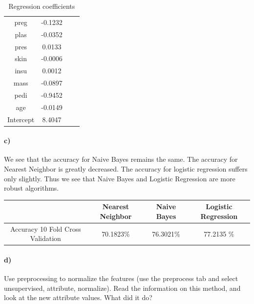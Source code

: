 \documentclass{article}
\begin{document}
\begin{table}[ht]
    \begin{center}
    \begin{tabular}{|c|c|c|c|}
   \hline
preg          &       -0.1232\\
plas             &    -0.0352\\
pres               &   0.0133\\
skin              &   -0.0006\\
insu               &   0.0012\\
mass              &   -0.0897\\
pedi             &    -0.9452\\
age            &      -0.0149\\   \hline
Intercept      &       8.4047\\    \hline%
    \end{tabular} \caption{Regression coefficients}\label{tab:coeffs}
    \end{center}
\end{table}



\paragraph{c)}We see that the accuracy for Naive Bayes remains the same. The accuracy for Nearest Neighbor is greatly decreased. The accuracy for logistic regression suffers only slightly. Thus we see that Naive Bayes and Logistic Regression are more robust algorithms. 

\begin{table}[ht]
    \begin{center}
    \begin{tabular}{|c|c|c|c|}
   \hline
        & Nearest Neighbor & Naive Bayes & Logistic Regression \\ \hline
         Accuracy 10 Fold Cross Validation &  70.1823\%&76.3021\% &  77.2135 \%   \\ \hline
       
             
     
    \end{tabular}
    \end{center}
\end{table}



\paragraph{d)}
Use preprocessing to normalize the features (use the preprocess tab and select unsupervised, attribute, normalize). Read the information on this method, and look at the new attribute values. What did it do?
\end{document}
